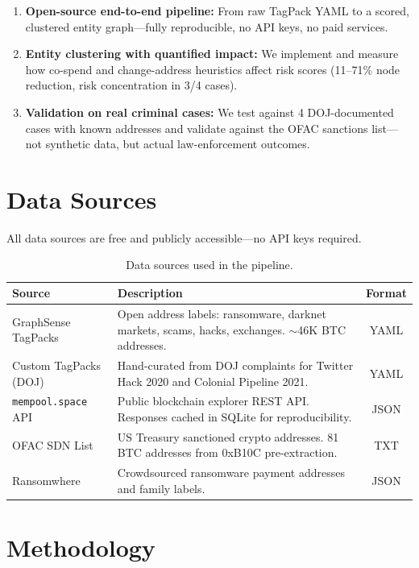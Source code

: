\documentclass[a4paper,11pt]{article}
\begin{document}
\begin{enumerate}
    \item \textbf{Open-source end-to-end pipeline:} From raw TagPack YAML to a scored, clustered entity graph---fully reproducible, no API keys, no paid services.
    \item \textbf{Entity clustering with quantified impact:} We implement and measure how co-spend and change-address heuristics affect risk scores (11--71\% node reduction, risk concentration in 3/4 cases).
    \item \textbf{Validation on real criminal cases:} We test against 4 DOJ-documented cases with known addresses and validate against the OFAC sanctions list---not synthetic data, but actual law-enforcement outcomes.
\end{enumerate}

\section{Data Sources}

All data sources are free and publicly accessible---no API keys required.

\begin{table}[H]
\centering
\small
\caption{Data sources used in the pipeline.}
\begin{tabularx}{\textwidth}{@{}lXc@{}}
\toprule
\textbf{Source} & \textbf{Description} & \textbf{Format} \\
\midrule
GraphSense TagPacks & Open address labels: ransomware, darknet markets, scams, hacks, exchanges. $\sim$46K BTC addresses. & YAML \\
Custom TagPacks (DOJ) & Hand-curated from DOJ complaints for Twitter Hack 2020 and Colonial Pipeline 2021. & YAML \\
\texttt{mempool.space} API & Public blockchain explorer REST API. Responses cached in SQLite for reproducibility. & JSON \\
OFAC SDN List & US Treasury sanctioned crypto addresses. 81 BTC addresses from 0xB10C pre-extraction. & TXT \\
Ransomwhere & Crowdsourced ransomware payment addresses and family labels. & JSON \\
\bottomrule
\end{tabularx}
\end{table}

\section{Methodology}
\end{document}
